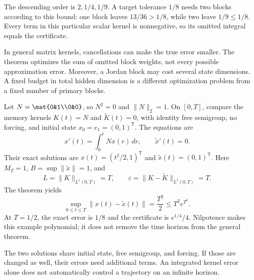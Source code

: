 The descending order is $2,1/4,1/9$. A target tolerance $1/8$ needs two blocks according to this bound: one block leaves $13/36>1/8$, while two leave $1/9\le1/8$. Every term in this particular scalar kernel is nonnegative, so its omitted integral equals the certificate.

In general matrix kernels, cancellations can make the true error smaller. The theorem optimizes the sum of omitted block weights, not every possible approximation error. Moreover, a Jordan block may cost several state dimensions. A fixed budget in total hidden dimension is a different optimization problem from a fixed number of primary blocks.

Let $N=\mat{0&1\\0&0}$, so $N^2=0$ and $\|N\|_2=1$. On $[0,T]$, compare the memory kernels $K(t)=N$ and $\widetilde K(t)=0$, with identity free semigroup, no forcing, and initial state $x_0=e_1=(0,1)^{\mathsf T}$. The equations are
\[
x'(t)=\int_0^t N x(r)\,dr,\qquad
\widetilde x'(t)=0.
\]
Their exact solutions are $x(t)=(t^2/2,1)^{\mathsf T}$ and $\widetilde x(t)=(0,1)^{\mathsf T}$.
Here $M_T=1$, $B=\sup\|\widetilde x\|=1$, and
\[
L=\|K\|_{L^1(0,T)}=T,\qquad
\varepsilon=\|K-\widetilde K\|_{L^1(0,T)}=T.
\]
The theorem yields
\[
\sup_{0\le t\le T}\|x(t)-\widetilde x(t)\|
=\frac{T^2}{2}\le T^2e^{T^2}.
\]
At $T=1/2$, the exact error is $1/8$ and the certificate is $e^{1/4}/4$. Nilpotence makes this example polynomial; it does not remove the time horizon from the general theorem.

The two solutions share initial state, free semigroup, and forcing. If those are changed as well, their errors need additional terms. An integrated kernel error alone does not automatically control a trajectory on an infinite horizon.

